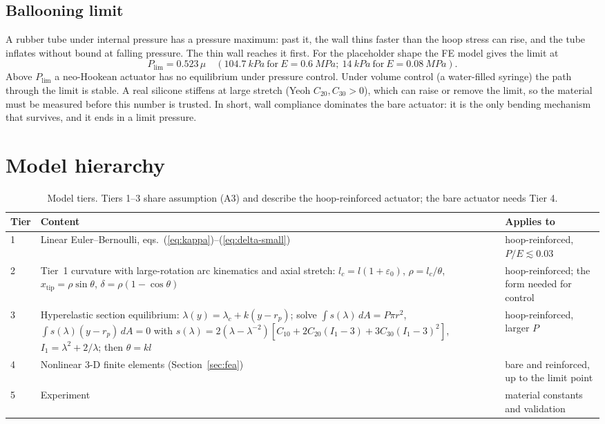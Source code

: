 \documentclass[11pt,a4paper]{article}
\numberwithin{equation}{section}
\newcommand{\rp}{r_p}
\begin{document}
\subsection{Ballooning limit}
A rubber tube under internal pressure has a pressure maximum: past it, the wall thins faster than the hoop stress can rise, and the tube inflates without bound at falling pressure.
The thin wall reaches it first. For the placeholder shape the FE model gives the limit at
\begin{equation}
P_{\text{lim}} = 0.523\,\mu \quad(\SI{104.7}{kPa}\ \text{for}\ E=\SI{0.6}{MPa};\ \SI{14}{kPa}\ \text{for}\ E=\SI{0.08}{MPa}).
\end{equation}
Above $P_{\text{lim}}$ a neo-Hookean actuator has no equilibrium under pressure control. Under volume control (a water-filled syringe) the path through the limit is stable.
A real silicone stiffens at large stretch (Yeoh $C_{20},C_{30}>0$), which can raise or remove the limit, so the material must be measured before this number is trusted.
In short, wall compliance dominates the bare actuator: it is the only bending mechanism that survives, and it ends in a limit pressure.

\section{Model hierarchy}\label{sec:tiers}

\begin{table}[H]
\centering\small
\begin{tabularx}{\textwidth}{@{}l>{\raggedright\arraybackslash}X>{\raggedright\arraybackslash}X@{}}
\toprule
Tier & Content & Applies to\\
\midrule
1 & Linear Euler--Bernoulli, eqs.~(\ref{eq:kappa})--(\ref{eq:delta-small}) & hoop-reinforced, $P/E\lesssim 0.03$\\
2 & Tier~1 curvature with large-rotation arc kinematics and axial stretch: $l_c = l(1+\varepsilon_0)$, $\rho = l_c/\theta$, $x_{\text{tip}} = \rho\sin\theta$, $\delta=\rho(1-\cos\theta)$ & hoop-reinforced; the form needed for control\\
3 & Hyperelastic section equilibrium: $\lambda(y) = \lambda_c + k(y-\rp)$; solve $\int s(\lambda)\,dA = P\pi r^2$, $\int s(\lambda)(y-\rp)\,dA=0$ with $s(\lambda) = 2(\lambda-\lambda^{-2})[C_{10}+2C_{20}(I_1-3)+3C_{30}(I_1-3)^2]$, $I_1=\lambda^2+2/\lambda$; then $\theta = kl$ & hoop-reinforced, larger $P$\\
4 & Nonlinear 3-D finite elements (Section~\ref{sec:fea}) & bare and reinforced, up to the limit point\\
5 & Experiment & material constants and validation\\
\bottomrule
\end{tabularx}
\caption{Model tiers. Tiers 1--3 share assumption (A3) and describe the hoop-reinforced actuator; the bare actuator needs Tier 4.}
\end{table}
\end{document}
